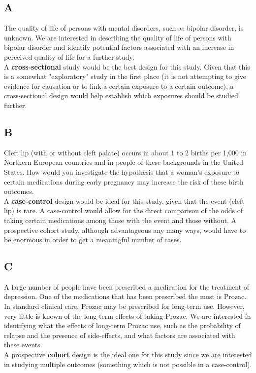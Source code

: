 \documentclass[12pt]{article}
\begin{document}
\subsection*{A}
\textcolor{black!50}{The quality of life of persons with mental disorders, such as bipolar disorder, is unknown.  We are interested in describing the quality of life of persons with bipolar disorder and identify potential factors associated with an increase in perceived quality of life for a further study.}\\

\noindent A \textbf{cross-sectional} study would be the best design for this study.  Given that this is a somewhat "exploratory" study in the first place (it is not attempting to give evidence for causation or to link a certain exposure to a certain outcome), a cross-sectional design would help establish which exposures should be studied further.  

\subsection*{B}
\textcolor{black!50}{Cleft lip (with or without cleft palate) occurs in about 1 to 2 births per 1,000 in Northern European countries and in people of these backgrounds in the United States.  How would you investigate the hypothesis that a woman's exposure to certain medications during early pregnancy may increase the risk of these birth outcomes.}\\

\noindent A \textbf{case-control} design would be ideal for this study, given that the event (cleft lip) is rare.  A case-control would allow for the direct comparison of the odds of taking certain medications among those with the event and those without.  A prospective cohort study, although advantageous any many ways, would have to be enormous in order to get a meaningful number of cases.

\subsection*{C}
\textcolor{black!50}{A large number of people have been prescribed a medication for the treatment of depression.  One of the medications that has been prescribed the most is Prozac.  In standard clinical care, Prozac may be prescribed for long-term use.  However, very little is known of the long-term effects of taking Prozac.  We are interested in identifying what the effects of long-term Prozac use, such as the probability of relapse and the presence of side-effects, and what factors are associated with these events.}\\

\noindent A prospective \textbf{cohort} design is the ideal one for this study since we are interested in studying multiple outcomes (something which is not possible in a case-control).  
\end{document}
